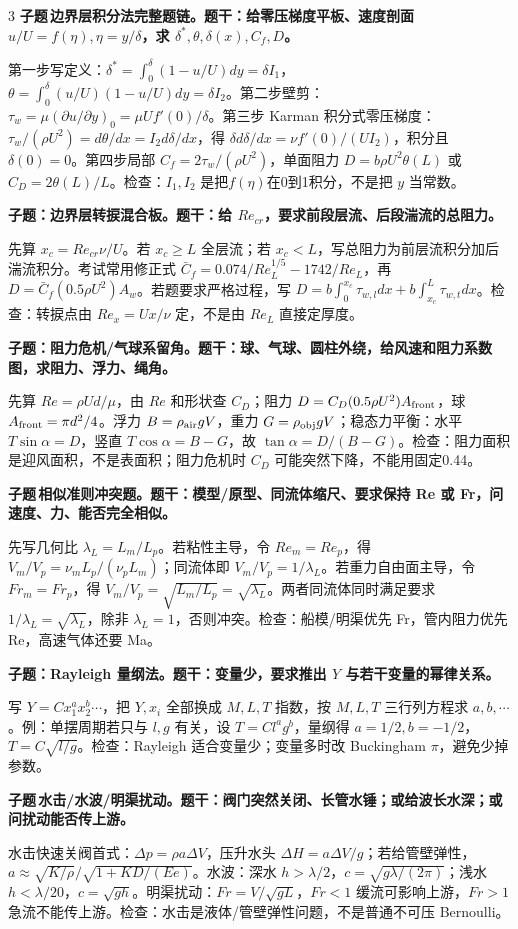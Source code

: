 \documentclass[a4paper]{article}
\newcommand{\qt}[1]{\vspace{0.04pt}\colorbox{Q}{\parbox{\dimexpr\linewidth-2\fboxsep}{\color{white}\bfseries #1}}\par}
\newcommand{\ans}[1]{\colorbox{G}{\parbox{\dimexpr\linewidth-2\fboxsep}{#1}}\par}
\newcommand{\labtag}[3]{{\bfseries\color{#1}\colorbox{#1}{\color{white}\fontsize{2.18}{2.28}\selectfont #2}\,#3}\par}
\newcommand{\subt}[1]{\labtag{Q}{子题}{#1}}
\begin{document}
\begin{multicols}{3}
\subt{边界层积分法完整题链。题干：给零压梯度平板、速度剖面 $u/U=f(\eta),\eta=y/\delta$，求 $\delta^*,\theta,\delta(x),C_f,D$。}
\ans{第一步写定义：$\delta^*=\int_0^\delta(1-u/U)dy=\delta I_1$，$\theta=\int_0^\delta(u/U)(1-u/U)dy=\delta I_2$。第二步壁剪：$\tau_w=\mu(\partial u/\partial y)_0=\mu U f'(0)/\delta$。第三步 Karman 积分式零压梯度：$\tau_w/(\rho U^2)=d\theta/dx=I_2d\delta/dx$，得 $\delta d\delta/dx=\nu f'(0)/(UI_2)$，积分且$\delta(0)=0$。第四步局部 $C_f=2\tau_w/(\rho U^2)$，单面阻力 $D=b\rho U^2\theta(L)$ 或 $C_D=2\theta(L)/L$。检查：$I_1,I_2$ 是把$f(\eta)$在0到1积分，不是把 $y$ 当常数。}
\qt{子题：边界层转捩混合板。题干：给 $Re_{cr}$，要求前段层流、后段湍流的总阻力。}
\ans{先算 $x_c=Re_{cr}\nu/U$。若 $x_c\ge L$ 全层流；若 $x_c<L$，写总阻力为前层流积分加后湍流积分。考试常用修正式 $\bar C_f=0.074/Re_L^{1/5}-1742/Re_L$，再 $D=\bar C_f(0.5\rho U^2)A_w$。若题要求严格过程，写 $D=b\int_0^{x_c}\tau_{w,l}dx+b\int_{x_c}^{L}\tau_{w,t}dx$。检查：转捩点由 $Re_x=Ux/\nu$ 定，不是由 $Re_L$ 直接定厚度。}
\qt{子题：阻力危机/气球系留角。题干：球、气球、圆柱外绕，给风速和阻力系数图，求阻力、浮力、绳角。}
\ans{先算 $Re=\rho Ud/\mu$，由 $Re$ 和形状查 $C_D$；阻力 $D=C_D(0.5\rho U^2)A_{\rm front}$，球 $A_{\rm front}=\pi d^2/4$。浮力 $B=\rho_{\rm air}gV$，重力 $G=\rho_{\rm obj}gV$；稳态力平衡：水平 $T\sin\alpha=D$，竖直 $T\cos\alpha=B-G$，故 $\tan\alpha=D/(B-G)$。检查：阻力面积是迎风面积，不是表面积；阻力危机时 $C_D$ 可能突然下降，不能用固定0.44。}
\subt{相似准则冲突题。题干：模型/原型、同流体缩尺、要求保持 Re 或 Fr，问速度、力、能否完全相似。}
\ans{先写几何比 $\lambda_L=L_m/L_p$。若粘性主导，令 $Re_m=Re_p$，得 $V_m/V_p=\nu_m L_p/(\nu_p L_m)$；同流体即 $V_m/V_p=1/\lambda_L$。若重力自由面主导，令 $Fr_m=Fr_p$，得 $V_m/V_p=\sqrt{L_m/L_p}=\sqrt{\lambda_L}$。两者同流体同时满足要求 $1/\lambda_L=\sqrt{\lambda_L}$，除非 $\lambda_L=1$，否则冲突。检查：船模/明渠优先 Fr，管内阻力优先 Re，高速气体还要 Ma。}
\qt{子题：Rayleigh 量纲法。题干：变量少，要求推出 $Y$ 与若干变量的幂律关系。}
\ans{写 $Y=Cx_1^ax_2^b\cdots$，把 $Y,x_i$ 全部换成 $M,L,T$ 指数，按 $M,L,T$ 三行列方程求 $a,b,\cdots$。例：单摆周期若只与 $l,g$ 有关，设 $T=Cl^ag^b$，量纲得 $a=1/2,b=-1/2$，$T=C\sqrt{l/g}$。检查：Rayleigh 适合变量少；变量多时改 Buckingham $\pi$，避免少掉参数。}
\subt{水击/水波/明渠扰动。题干：阀门突然关闭、长管水锤；或给波长水深；或问扰动能否传上游。}
\ans{水击快速关阀首式：$\Delta p=\rho a\Delta V$，压升水头 $\Delta H=a\Delta V/g$；若给管壁弹性，$a\approx\sqrt{K/\rho}/\sqrt{1+KD/(Ee)}$。水波：深水 $h>\lambda/2$，$c=\sqrt{g\lambda/(2\pi)}$；浅水 $h<\lambda/20$，$c=\sqrt{gh}$。明渠扰动：$Fr=V/\sqrt{gL}$，$Fr<1$ 缓流可影响上游，$Fr>1$ 急流不能传上游。检查：水击是液体/管壁弹性问题，不是普通不可压 Bernoulli。}

\end{multicols}
\end{document}
